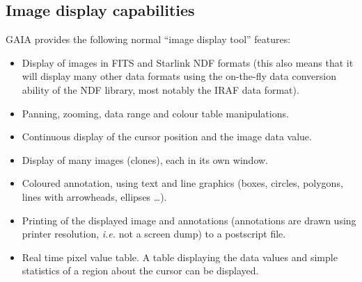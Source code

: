 \documentclass[twoside,11pt]{article}
\newcommand{\xref}[3]{#1}
\newcommand{\xlabel}[1]{}
\renewcommand{\_}{\texttt{\symbol{95}}}
\begin{document}
\subsection{\xlabel{image_display_capabilities}Image display capabilities}
GAIA provides the following normal ``image display tool'' features:
\begin{itemize}
\item Display of images in FITS and Starlink \xref{NDF}{sun33}{}
  formats (this also means that it will display many other data formats
  using the on-the-fly data conversion ability of the NDF library, most
  notably the IRAF data format).

\item Panning, zooming, data range and colour table manipulations.

\item Continuous display of the cursor position and the image data
  value.

\item Display of many images (clones), each in its own window.

\item Coloured annotation, using text and line graphics (boxes,
  circles, polygons, lines with arrowheads, ellipses \ldots).

\item Printing of the displayed image and annotations (annotations
  are drawn using printer resolution, \textit{i.e.} not a screen dump)
  to a postscript file.

\item Real time pixel value table. A table displaying the data
  values and simple statistics of a region about the cursor can be
  displayed.

\end{itemize}
\end{document}
